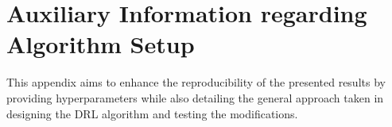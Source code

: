 \documentclass[preprint, 12pt]{elsarticle}
\begin{document}








%


\appendix
\section{Auxiliary Information regarding Algorithm Setup}\label{Appendix: Learning Curves}
This appendix aims to enhance the reproducibility of the presented results by providing hyperparameters while also detailing the general approach taken in designing the DRL algorithm and testing the modifications.
\end{document}
